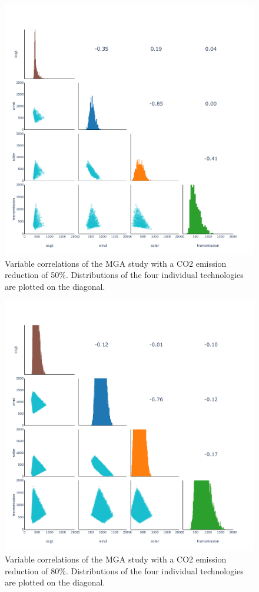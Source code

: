 \begin{figure}[p]\centerfloat
	\includegraphics[width=1.2\textwidth,trim={0 0cm 0 0cm},clip]{./Images/corelation_4D_50}
	\caption{Variable correlations of the MGA study with a CO2 emission reduction of 50\%. Distributions of the four individual technologies are plotted on the diagonal.}
\end{figure}

\begin{figure}[p]\centerfloat
	\includegraphics[width=1.2\textwidth,trim={0 0cm 0 0cm},clip]{./Images/corelation_4D_80}
	\caption{Variable correlations of the MGA study with a CO2 emission reduction of 80\%. Distributions of the four individual technologies are plotted on the diagonal.}
\end{figure}

